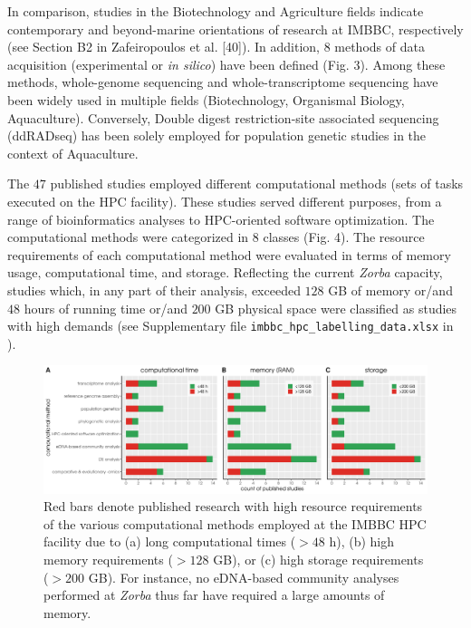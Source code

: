    In comparison, studies in the Biotechnology and Agriculture fields indicate contemporary and beyond-marine orientations of research at IMBBC, respectively (see Section B2 in Zafeiropoulos et al. [40]). 
   In addition, $8$ methods of data acquisition (experimental or \textit{in silico}) have been defined (Fig. 3). 
   Among these methods, whole-genome sequencing and whole-transcriptome sequencing have been widely used in multiple fields (Biotechnology, Organismal Biology, Aquaculture). 
   Conversely, Double digest restriction-site associated sequencing (ddRADseq) has been solely employed for population genetic studies in the context of Aquaculture.

   The $47$ published studies employed different computational methods (sets of tasks executed on the HPC facility). 
   These studies served different purposes, from a range of bioinformatics analyses to HPC-oriented software optimization. 
   The computational methods were categorized in $8$ classes (Fig. 4). 
   The resource requirements of each computational method were evaluated in terms of memory usage, computational time, and storage. Reflecting the current \textit{Zorba} capacity, studies which, in any part of their analysis, exceeded $128$ GB of memory or/and $48$ hours of running time or/and $200$ GB physical space were classified as studies with high demands (see Supplementary file \texttt{imbbc\_hpc\_labelling\_data.xlsx} in \citep{haris_zafeiropoulos_2021_4665308}).


   \begin{figure}
      \label{fig:resource}
      \centering
      \includegraphics[width=\columnwidth]{figures/computational_method_computational_requirement_plot.png}
      \caption{
         Red bars denote published research with high resource requirements of the various computational methods employed at the IMBBC HPC facility due to 
         (a) long computational times ($>48$ h), 
         (b) high memory requirements ($>128$ GB), or 
         (c) high storage requirements ($>200$ GB). 
         For instance, no eDNA-based community analyses performed at \textit{Zorba} thus far have required a large amounts of memory.}
   \end{figure}


